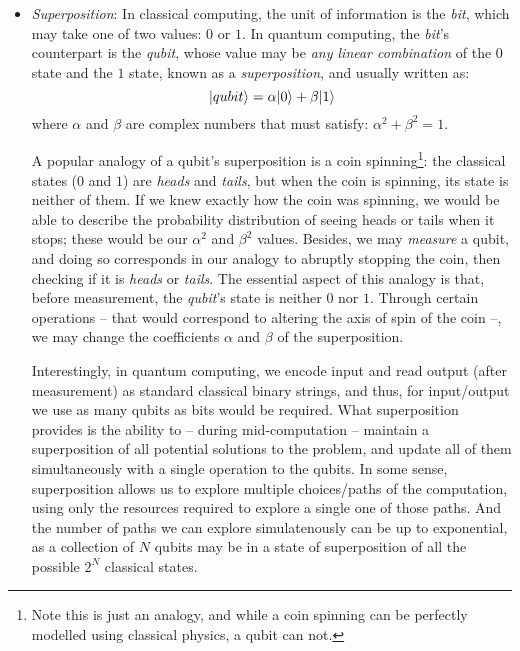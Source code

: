 \begin{itemize}

  \item \textit{Superposition}: In classical computing, the unit of information is the \textit{bit}, which may take one of two values: \(0\) or \(1\). In quantum computing, the \textit{bit}'s counterpart is the \textit{qubit}, whose value may be \textit{any linear combination} of the \(0\) state and the \(1\) state, known as a \textit{superposition}, and usually written as: \[\vert qubit \rangle = \alpha\vert 0 \rangle + \beta\vert 1 \rangle\] where \(\alpha\) and \(\beta\) are complex numbers that must satisfy: \(\alpha^2 + \beta^2 = 1\).

  A popular analogy of a qubit's superposition is a coin spinning\footnote{Note this is just an analogy, and while a coin spinning can be perfectly modelled using classical physics, a qubit can not.}: the classical states (\(0\) and \(1\)) are \textit{heads} and \textit{tails}, but when the coin is spinning, its state is neither of them. If we knew exactly how the coin was spinning, we would be able to describe the probability distribution of seeing heads or tails when it stops; these would be our \(\alpha^2\) and \(\beta^2\) values. Besides, we may \textit{measure} a qubit, and doing so corresponds in our analogy to abruptly stopping the coin, then checking if it is \textit{heads} or \textit{tails}. The essential aspect of this analogy is that, before measurement, the \textit{qubit}'s state is neither \(0\) nor \(1\). Through certain operations -- that would correspond to altering the axis of spin of the coin --, we may change the coefficients \(\alpha\) and \(\beta\) of the superposition. 

  Interestingly, in quantum computing, we encode input and read output (after measurement) as standard classical binary strings, and thus, for input/output we use as many qubits as bits would be required. What superposition provides is the ability to -- during mid-computation -- maintain a superposition of all potential solutions to the problem, and update all of them simultaneously with a single operation to the qubits. In some sense, superposition allows us to explore multiple choices/paths of the computation, using only the resources required to explore a single one of those paths. And the number of paths we can explore simulatenously can be up to exponential, as a collection of \(N\) qubits may be in a state of superposition of all the possible \(2^N\) classical states.


\end{itemize}
